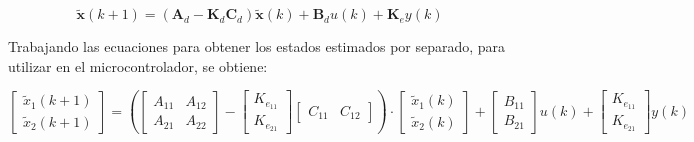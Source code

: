 \vspace{-0.5cm}
\begin{equation}
    \mathbf{\tilde{x}}(k+1) = (\textbf{A}_d - \textbf{K}_d \textbf{C}_d) \mathbf{\tilde{x}}(k) + \textbf{B}_d u(k) + \textbf{K}_e y(k)
\end{equation}

Trabajando las ecuaciones para obtener los estados estimados por separado, para utilizar en el microcontrolador, se obtiene:

\vspace{-0.5cm}
\begin{equation}
    \begin{bmatrix}
        \tilde{x}_1(k+1) \\
        \tilde{x}_2(k+1)
    \end{bmatrix}
    =
    \left(
        \begin{bmatrix}
            A_{11} & A_{12} \\
            A_{21} & A_{22}
        \end{bmatrix}
        -
        \begin{bmatrix}
            K_{e_{11}} \\
            K_{e_{21}}
        \end{bmatrix}
        \begin{bmatrix}
            C_{11} & C_{12}
        \end{bmatrix}    
    \right)
    \cdot
    \begin{bmatrix}
        \tilde{x}_1(k) \\
        \tilde{x}_2(k)
    \end{bmatrix}
    +
    \begin{bmatrix}
        B_{11} \\
        B_{21}
    \end{bmatrix}
    u(k)
    +
    \begin{bmatrix}
        K_{e_{11}} \\
        K_{e_{21}}
    \end{bmatrix}
    y(k)
\end{equation}
\vspace{-0.5cm}

